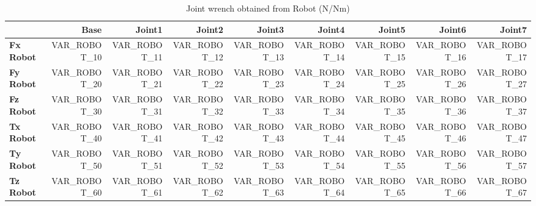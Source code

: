 \begin{table}[h!]
	\centering
	\caption{Joint wrench obtained from Robot (N/Nm)}
	\label{VAR_LABEL_ROBOT}
	\begin{tabular}{|l|r|r|r|r|r|r|r|r|}
		\hline
		\textbf{} & \textbf{Base} & \textbf{Joint1}  & \textbf{Joint2}  & \textbf{Joint3}  & \textbf{Joint4}  & \textbf{Joint5}  & \textbf{Joint6}  & \textbf{Joint7} \\ \hline
		\textbf{Fx Robot}  & VAR_ROBOT_10        & VAR_ROBOT_11        & VAR_ROBOT_12        & VAR_ROBOT_13        & VAR_ROBOT_14        & VAR_ROBOT_15        & VAR_ROBOT_16        & VAR_ROBOT_17 \\ \hline
		\textbf{Fy Robot}  & VAR_ROBOT_20        & VAR_ROBOT_21        & VAR_ROBOT_22        & VAR_ROBOT_23        & VAR_ROBOT_24        & VAR_ROBOT_25        & VAR_ROBOT_26        & VAR_ROBOT_27 \\ \hline
		\textbf{Fz Robot}  & VAR_ROBOT_30        & VAR_ROBOT_31        & VAR_ROBOT_32        & VAR_ROBOT_33        & VAR_ROBOT_34        & VAR_ROBOT_35        & VAR_ROBOT_36        & VAR_ROBOT_37 \\ \hline
		\textbf{Tx Robot}  & VAR_ROBOT_40        & VAR_ROBOT_41        & VAR_ROBOT_42        & VAR_ROBOT_43        & VAR_ROBOT_44        & VAR_ROBOT_45        & VAR_ROBOT_46        & VAR_ROBOT_47 \\ \hline
		\textbf{Ty Robot}  & VAR_ROBOT_50        & VAR_ROBOT_51        & VAR_ROBOT_52        & VAR_ROBOT_53        & VAR_ROBOT_54        & VAR_ROBOT_55        & VAR_ROBOT_56        & VAR_ROBOT_57 \\ \hline
		\textbf{Tz Robot}  & VAR_ROBOT_60        & VAR_ROBOT_61        & VAR_ROBOT_62        & VAR_ROBOT_63        & VAR_ROBOT_64        & VAR_ROBOT_65        & VAR_ROBOT_66        & VAR_ROBOT_67 \\ \hline
	\end{tabular}
\end{table}

